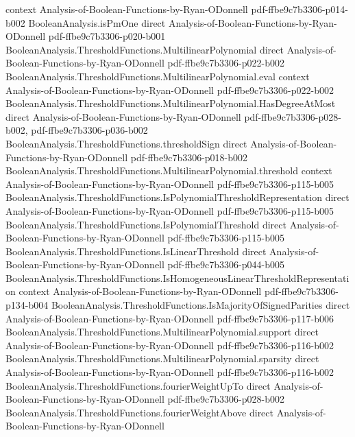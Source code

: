 \begin{theorem}
  {context}
  {Analysis-of-Boolean-Functions-by-Ryan-ODonnell}
  {pdf-ffbe9c7b3306-p014-b002}
\proofstep
  {BooleanAnalysis.isPmOne}
  {direct}
  {Analysis-of-Boolean-Functions-by-Ryan-ODonnell}
  {pdf-ffbe9c7b3306-p020-b001}
\proofstep
  {BooleanAnalysis.ThresholdFunctions.MultilinearPolynomial}
  {direct}
  {Analysis-of-Boolean-Functions-by-Ryan-ODonnell}
  {pdf-ffbe9c7b3306-p022-b002}
\proofstep
  {BooleanAnalysis.ThresholdFunctions.MultilinearPolynomial.eval}
  {context}
  {Analysis-of-Boolean-Functions-by-Ryan-ODonnell}
  {pdf-ffbe9c7b3306-p022-b002}
\proofstep
  {BooleanAnalysis.ThresholdFunctions.MultilinearPolynomial.HasDegreeAtMost}
  {direct}
  {Analysis-of-Boolean-Functions-by-Ryan-ODonnell}
  {pdf-ffbe9c7b3306-p028-b002,
    pdf-ffbe9c7b3306-p036-b002}
\proofstep
  {BooleanAnalysis.ThresholdFunctions.thresholdSign}
  {direct}
  {Analysis-of-Boolean-Functions-by-Ryan-ODonnell}
  {pdf-ffbe9c7b3306-p018-b002}
\proofstep
  {BooleanAnalysis.ThresholdFunctions.MultilinearPolynomial.threshold}
  {context}
  {Analysis-of-Boolean-Functions-by-Ryan-ODonnell}
  {pdf-ffbe9c7b3306-p115-b005}
\proofstep
  {BooleanAnalysis.ThresholdFunctions.IsPolynomialThresholdRepresentation}
  {direct}
  {Analysis-of-Boolean-Functions-by-Ryan-ODonnell}
  {pdf-ffbe9c7b3306-p115-b005}
\proofstep
  {BooleanAnalysis.ThresholdFunctions.IsPolynomialThreshold}
  {direct}
  {Analysis-of-Boolean-Functions-by-Ryan-ODonnell}
  {pdf-ffbe9c7b3306-p115-b005}
\proofstep
  {BooleanAnalysis.ThresholdFunctions.IsLinearThreshold}
  {direct}
  {Analysis-of-Boolean-Functions-by-Ryan-ODonnell}
  {pdf-ffbe9c7b3306-p044-b005}
\proofstep
  {BooleanAnalysis.ThresholdFunctions.IsHomogeneousLinearThresholdRepresentation}
  {context}
  {Analysis-of-Boolean-Functions-by-Ryan-ODonnell}
  {pdf-ffbe9c7b3306-p134-b004}
\proofstep
  {BooleanAnalysis.ThresholdFunctions.IsMajorityOfSignedParities}
  {direct}
  {Analysis-of-Boolean-Functions-by-Ryan-ODonnell}
  {pdf-ffbe9c7b3306-p117-b006}
\proofstep
  {BooleanAnalysis.ThresholdFunctions.MultilinearPolynomial.support}
  {direct}
  {Analysis-of-Boolean-Functions-by-Ryan-ODonnell}
  {pdf-ffbe9c7b3306-p116-b002}
\proofstep
  {BooleanAnalysis.ThresholdFunctions.MultilinearPolynomial.sparsity}
  {direct}
  {Analysis-of-Boolean-Functions-by-Ryan-ODonnell}
  {pdf-ffbe9c7b3306-p116-b002}
\proofstep
  {BooleanAnalysis.ThresholdFunctions.fourierWeightUpTo}
  {direct}
  {Analysis-of-Boolean-Functions-by-Ryan-ODonnell}
  {pdf-ffbe9c7b3306-p028-b002}
\proofstep
  {BooleanAnalysis.ThresholdFunctions.fourierWeightAbove}
  {direct}
  {Analysis-of-Boolean-Functions-by-Ryan-ODonnell}

\end{theorem}

